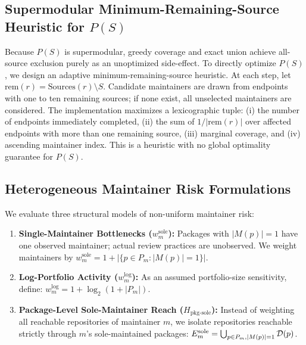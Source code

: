 \subsection{Supermodular Minimum-Remaining-Source Heuristic for $P(S)$}
Because $P(S)$ is supermodular, greedy coverage and exact union achieve all-source exclusion purely as an unoptimized side-effect. To directly optimize $P(S)$, we design an adaptive minimum-remaining-source heuristic. At each step, let $\text{rem}(r)=\text{Sources}(r)\setminus S$. Candidate maintainers are drawn from endpoints with one to ten remaining sources; if none exist, all unselected maintainers are considered. The implementation maximizes a lexicographic tuple: (i) the number of endpoints immediately completed, (ii) the sum of $1/|\text{rem}(r)|$ over affected endpoints with more than one remaining source, (iii) marginal coverage, and (iv) ascending maintainer index. This is a heuristic with no global optimality guarantee for $P(S)$.

\subsection{Heterogeneous Maintainer Risk Formulations}
We evaluate three structural models of non-uniform maintainer risk:
\begin{enumerate}
    \item \textbf{Single-Maintainer Bottlenecks ($w_m^{\text{sole}}$):} Packages with $|M(p)|=1$ have one observed maintainer; actual review practices are unobserved. We weight maintainers by $w_m^{\text{sole}} = 1 + |\{p \in P_m : |M(p)| = 1\}|$.
    \item \textbf{Log-Portfolio Activity ($w_m^{\text{log}}$):} As an assumed portfolio-size sensitivity, define: $w_m^{\text{log}} = 1 + \log_2(1 + |P_m|)$.
    \item \textbf{Package-Level Sole-Maintainer Reach ($H_{\text{pkg-sole}}$):} Instead of weighting all reachable repositories of maintainer $m$, we isolate repositories reachable strictly through $m$'s sole-maintained packages: $E_m^{\text{sole}} = \bigcup_{p \in P_m, |M(p)|=1} \mathcal{D}(p)$.
\end{enumerate}

